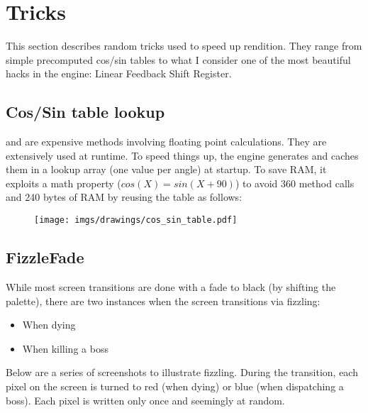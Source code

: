 \section{Tricks}

This section describes random tricks used to speed up rendition. They range from simple precomputed cos/sin tables to what I consider one of the most beautiful hacks in the engine: Linear Feedback Shift Register.




\subsection{Cos/Sin table lookup}
 and  are expensive methods involving floating point calculations. They are extensively used at runtime. To speed things up, the engine generates and caches them in a lookup array (one value per angle) at startup. To save RAM, it exploits a math property ($cos(X) = sin(X + 90)$) to avoid 360  method calls and 240 bytes of RAM by reusing the  table as follows:\\
\par
\label{cossintable}
\begin{minipage}{\textwidth}

\end{minipage}


\begin{figure}[H]
 \centering
  \texttt{[image: imgs/drawings/cos\_sin\_table.pdf]}
\end{figure}








\subsection{FizzleFade}
While most screen transitions are done with a fade to black (by shifting the palette), there are two instances when the screen transitions via fizzling:
\begin{itemize}
	\item When dying
	\item When killing a boss
\end{itemize}
Below are a series of screenshots to illustrate fizzling. During the transition, each pixel on the screen is turned to red (when dying) or blue (when dispatching a boss). Each pixel is written only once and seemingly at random. 



